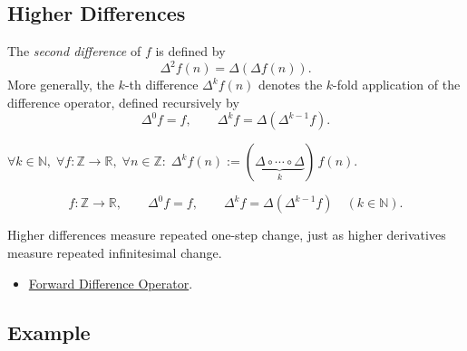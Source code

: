 
\subsection{Higher Differences}
\label{subsec:higher-differences}

\begin{definition}
\label{def:higher-differences}
The \emph{second difference} of \(f\) is defined by
\[
\Delta^2 f(n) = \Delta(\Delta f(n)).
\]
More generally, the \(k\)-th difference \(\Delta^k f(n)\) denotes the
\(k\)-fold application of the difference operator, defined recursively by
\[
\Delta^0 f = f, \qquad \Delta^k f = \Delta(\Delta^{k-1} f).
\]
\end{definition}

\begin{remark*}
\(\forall k \in \mathbb{N},\; \forall f : \mathbb{Z}\to\mathbb{R},\;
\forall n \in \mathbb{Z}:\;
\Delta^k f(n) := (\underbrace{\Delta \circ \cdots \circ \Delta}_{k})\,f(n)\).
\end{remark*}

\begin{remark*}
\[
  f\colon\mathbb{Z}\to\mathbb{R},\qquad
  \Delta^0 f=f,\qquad
  \Delta^k f=\Delta(\Delta^{k-1}f)\quad(k\in\mathbb{N}).
\]
\end{remark*}

\begin{remark*}[Interpretation]
Higher differences measure repeated one-step change, just as higher
derivatives measure repeated infinitesimal change.
\end{remark*}

\begin{dependencies}
\begin{itemize}
  \item \hyperref[def:forward-difference]{Forward Difference Operator}.
\end{itemize}
\end{dependencies}

\subsection*{Example}

